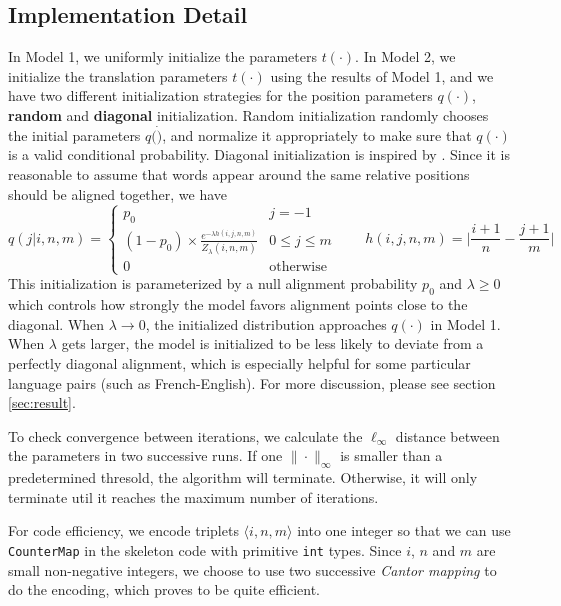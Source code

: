 \documentclass[letterpaper]{article}
\begin{document}
\subsection{Implementation Detail}\label{sec:imp}
In Model 1, we uniformly initialize the parameters $t(\cdot)$.
In Model 2, we initialize the translation parameters $t(\cdot)$ using the results of Model 1, and we have two different initialization strategies for the position parameters $q(\cdot)$, \textbf{random} and \textbf{diagonal} initialization. Random initialization randomly chooses the initial parameters $q(\dot)$, and normalize it appropriately to make sure that $q(\cdot)$ is a valid conditional probability.
Diagonal initialization is inspired by \cite{dyer2013simple}. Since it is reasonable to assume that words appear around the same relative positions should be aligned together,  we have
\begin{equation}
q(j | i, n, m) = \left\{
\begin{array}{cc}
p_0 & j = -1 \\
(1-p_0) \times \frac{e^{-\lambda h(i, j, n, m)}}{Z_\lambda(i, n, m)} & 0 \le j \le m \\
0 & \textrm{otherwise}
\end{array}\right.
\qquad
h(i, j, n, m) = \Bigg| \frac{i+1}{n} - \frac{j+1}{m} \Bigg|
\end{equation}
This initialization is parameterized by a null alignment probability $p_0$ and $\lambda \ge 0$ which controls how strongly the model favors alignment points close to the diagonal.
When $\lambda \rightarrow 0$, the initialized distribution approaches $q(\cdot)$ in Model 1.
When $\lambda$ gets larger, the model is initialized to be less likely to deviate from a perfectly diagonal alignment, which is especially helpful for some particular language pairs (such as French-English). For more discussion, please see section \ref{sec:result}.

\vspace{0.1cm}

To check convergence between iterations, we calculate the $\ell_{\infty}$ distance between the parameters in two successive runs. If one $\| \cdot \|_\infty$ is smaller than a predetermined thresold, the algorithm will terminate. Otherwise, it will only terminate util it reaches the maximum number of iterations.

\vspace{0.1cm}

For code efficiency, we encode triplets $\langle i, n, m \rangle$ into one integer so that we can use \texttt{CounterMap} in the skeleton code with primitive \texttt{int} types. Since $i$, $n$ and $m$ are small non-negative integers, we choose to use two successive \emph{Cantor mapping} to do the encoding, which proves to be quite efficient.
\end{document}
